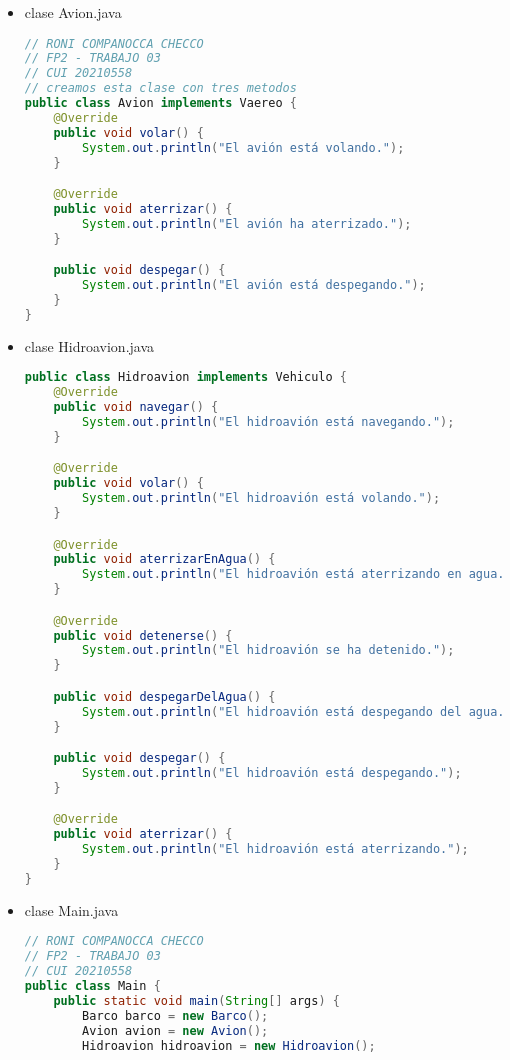 \documentclass{article}
\begin{document}
\begin{itemize}
\begin{lstlisting}[language=java]
    @Override
    public void detenerse() {
        System.out.println("El barco se ha detenido.");
    }

    public void cargarMercancia() {
        System.out.println("Cargando mercancía en el barco.");
    }
}
        \end{lstlisting}

        \item clase Avion.java
        \begin{lstlisting}[language=java]
// RONI COMPANOCCA CHECCO
// FP2 - TRABAJO 03
// CUI 20210558
// creamos esta clase con tres metodos
public class Avion implements Vaereo {
    @Override
    public void volar() {
        System.out.println("El avión está volando.");
    }

    @Override
    public void aterrizar() {
        System.out.println("El avión ha aterrizado.");
    }

    public void despegar() {
        System.out.println("El avión está despegando.");
    }
}
        \end{lstlisting}

        \item clase Hidroavion.java
        \begin{lstlisting}[language=java]
public class Hidroavion implements Vehiculo {
    @Override
    public void navegar() {
        System.out.println("El hidroavión está navegando.");
    }

    @Override
    public void volar() {
        System.out.println("El hidroavión está volando.");
    }

    @Override
    public void aterrizarEnAgua() {
        System.out.println("El hidroavión está aterrizando en agua.");
    }

    @Override
    public void detenerse() {
        System.out.println("El hidroavión se ha detenido.");
    }

    public void despegarDelAgua() {
        System.out.println("El hidroavión está despegando del agua.");
    }

    public void despegar() {
        System.out.println("El hidroavión está despegando.");
    }

    @Override
    public void aterrizar() {
        System.out.println("El hidroavión está aterrizando.");
    }
}
        \end{lstlisting}

        \item clase Main.java
        \begin{lstlisting}[language=java]
// RONI COMPANOCCA CHECCO
// FP2 - TRABAJO 03
// CUI 20210558
public class Main {
    public static void main(String[] args) {
        Barco barco = new Barco();
        Avion avion = new Avion();
        Hidroavion hidroavion = new Hidroavion();


\end{lstlisting}
\end{itemize}
\end{document}
